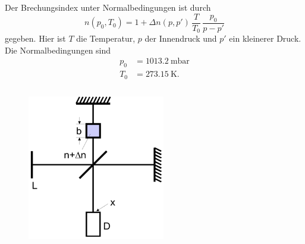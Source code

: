 \noindent Der Brechungsindex unter Normalbedingungen ist durch
\begin{equation}
    n(p_0, T_0) = 1 + \Delta n(p,p') \, \frac{T}{T_0} \, \frac{p_0}{p - p'}
    \label{eqn:n}
\end{equation}
gegeben. Hier ist $T$ die Temperatur, $p$ der Innendruck und $p'$ ein kleinerer Druck.
Die Normalbedingungen sind
\begin{align*}
    p_0 &= \SI{1013.2}{\milli\bar} \\
    T_0 &= \SI{273.15}{\kelvin}.
\end{align*}

\begin{figure}
    \centering
    \includegraphics[width=6cm, height=7cm]{build/michelson2.png}
    \caption{}
    \label{fig:michelson2}
\end{figure}




